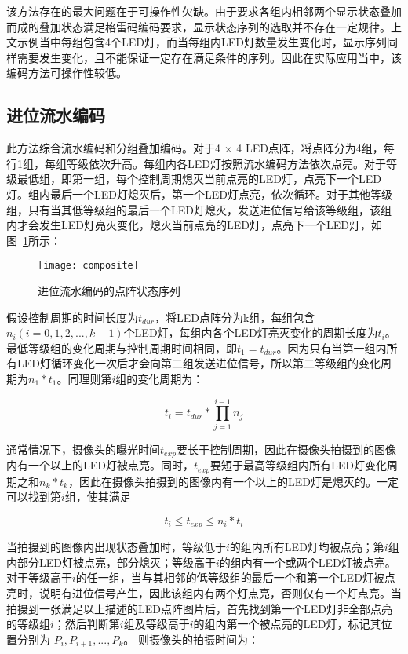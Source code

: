 该方法存在的最大问题在于可操作性欠缺。由于要求各组内相邻两个显示状态叠加而成的叠加状态满足格雷码编码要求，显示状态序列的选取并不存在一定规律。上文示例当中每组包含4个LED灯，而当每组内LED灯数量发生变化时，显示序列同样需要发生变化，且不能保证一定存在满足条件的序列。因此在实际应用当中，该编码方法可操作性较低。

\subsection{进位流水编码}
\label{flowSe}

此方法综合流水编码和分组叠加编码。对于4 × 4 LED点阵，将点阵分为4组，每行1组，每组等级依次升高。每组内各LED灯按照流水编码方法依次点亮。对于等级最低组，即第一组，每个控制周期熄灭当前点亮的LED灯，点亮下一个LED灯。组内最后一个LED灯熄灭后，第一个LED灯点亮，依次循环。对于其他等级组，只有当其低等级组的最后一个LED灯熄灭，发送进位信号给该等级组，该组内才会发生LED灯亮灭变化，熄灭当前点亮的LED灯，点亮下一个LED灯，如图~\ref{composite}所示：

\begin{figure}[h] 
  \centering
  \texttt{[image: composite]}
  \caption{进位流水编码的点阵状态序列}
  \label{composite}
\end{figure}

假设控制周期的时间长度为$t_{dur}$，将LED点阵分为k组，每组包含$n_i(i = 0, 1, 2, ..., k-1)$个LED灯，每组内各个LED灯亮灭变化的周期长度为$t_i$。最低等级组的变化周期与控制周期时间相同，即$t_1 = t_{dur}$。因为只有当第一组内所有LED灯循环变化一次后才会向第二组发送进位信号，所以第二等级组的变化周期为$n_1 * t_1$。同理则第$i$组的变化周期为：

\begin{equation}
t_i = t_{dur} * \prod_{j=1}^{i-1} n_j
  \label{4}
\end{equation}

通常情况下，摄像头的曝光时间$t_{exp}$要长于控制周期，因此在摄像头拍摄到的图像内有一个以上的LED灯被点亮。同时，$t_{exp}$要短于最高等级组内所有LED灯变化周期之和$n_k * t_k$，因此在摄像头拍摄到的图像内有一个以上的LED灯是熄灭的。一定可以找到第$i$组，使其满足

\begin{equation}
t_i \le t_{exp} \le n_i * t_i
  \label{5}
\end{equation}

当拍摄到的图像内出现状态叠加时，等级低于$i$的组内所有LED灯均被点亮；第$i$组内部分LED灯被点亮，部分熄灭；等级高于$i$的组内有一个或两个LED灯被点亮。对于等级高于$i$的任一组，当与其相邻的低等级组的最后一个和第一个LED灯被点亮时，说明有进位信号产生，因此该组内有两个灯点亮，否则仅有一个灯点亮。当拍摄到一张满足以上描述的LED点阵图片后，首先找到第一个LED灯非全部点亮的等级组$i$；然后判断第$i$组及等级高于$i$的组内第一个被点亮的LED灯，标记其位置分别为 $P_i, P_{i + 1}, ..., P_k$。 则摄像头的拍摄时间为：

